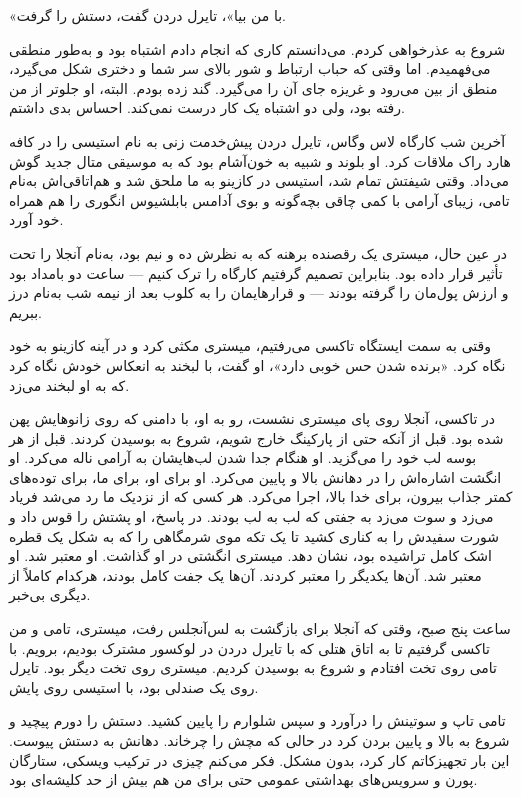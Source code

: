 «با من بیا»، تایرل دردن گفت، دستش را گرفت.

شروع به عذرخواهی کردم. می‌دانستم کاری که انجام دادم اشتباه بود و به‌طور منطقی می‌فهمیدم. اما وقتی که حباب ارتباط و شور بالای سر شما و دختری شکل می‌گیرد، منطق از بین می‌رود و غریزه جای آن را می‌گیرد. گند زده بودم. البته، او جلوتر از من رفته بود، ولی دو اشتباه یک کار درست نمی‌کند. احساس بدی داشتم.

آخرین شب کارگاه لاس وگاس، تایرل دردن پیش‌خدمت زنی به نام استیسی را در کافه هارد راک ملاقات کرد. او بلوند و شبیه به خون‌آشام بود که به موسیقی متال جدید گوش می‌داد. وقتی شیفتش تمام شد، استیسی در کازینو به ما ملحق شد و هم‌اتاقی‌اش به‌نام تامی، زیبای آرامی با کمی چاقی بچه‌گونه و بوی آدامس بابلشیوس انگوری را هم همراه خود آورد.

در عین حال، میستری یک رقصنده برهنه که به نظرش ده و نیم بود، به‌نام آنجلا را تحت تأثیر قرار داده بود. بنابراین تصمیم گرفتیم کارگاه را ترک کنیم — ساعت دو بامداد بود و ارزش پول‌مان را گرفته بودند — و قرارهایمان را به کلوب بعد از نیمه شب به‌نام درز ببریم.

وقتی به سمت ایستگاه تاکسی می‌رفتیم، میستری مکثی کرد و در آینه کازینو به خود نگاه کرد. «برنده شدن حس خوبی دارد»، او گفت، با لبخند به انعکاس خودش نگاه کرد که به او لبخند می‌زد.

در تاکسی، آنجلا روی پای میستری نشست، رو به او، با دامنی که روی زانوهایش پهن شده بود. قبل از آنکه حتی از پارکینگ خارج شویم، شروع به بوسیدن کردند. قبل از هر بوسه لب خود را می‌گزید. او هنگام جدا شدن لب‌هایشان به آرامی ناله می‌کرد. او انگشت اشاره‌اش را در دهانش بالا و پایین می‌کرد. او برای او، برای ما، برای توده‌های کمتر جذاب بیرون، برای خدا بالا، اجرا می‌کرد. هر کسی که از نزدیک ما رد می‌شد فریاد می‌زد و سوت می‌زد به جفتی که لب به لب بودند. در پاسخ، او پشتش را قوس داد و شورت سفیدش را به کناری کشید تا یک تکه موی شرمگاهی را که به شکل یک قطره اشک کامل تراشیده بود، نشان دهد. میستری انگشتی در او گذاشت. او معتبر شد. او معتبر شد. آن‌ها یکدیگر را معتبر کردند. آن‌ها یک جفت کامل بودند، هرکدام کاملاً از دیگری بی‌خبر.  

ساعت پنج صبح، وقتی که آنجلا برای بازگشت به لس‌آنجلس رفت، میستری، تامی و من تاکسی گرفتیم تا به اتاق هتلی که با تایرل دردن در لوکسور مشترک بودیم، برویم. با تامی روی تخت افتادم و شروع به بوسیدن کردیم. میستری روی تخت دیگر بود. تایرل روی یک صندلی بود، با استیسی روی پایش.

تامی تاپ و سوتینش را درآورد و سپس شلوارم را پایین کشید. دستش را دورم پیچید و شروع به بالا و پایین بردن کرد در حالی که مچش را چرخاند. دهانش به دستش پیوست. این بار تجهیزکاتم کار کرد، بدون مشکل. فکر می‌کنم چیزی در ترکیب ویسکی، ستارگان پورن و سرویس‌های بهداشتی عمومی حتی برای من هم بیش از حد کلیشه‌ای بود.